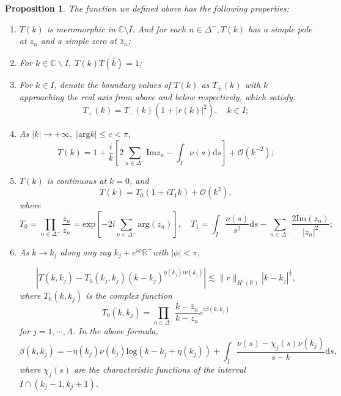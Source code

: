 \documentclass[11pt]{article}
\numberwithin{equation}{section}
\newtheorem{Proposition}{Proposition}
\begin{document}
\begin{Proposition}\label{p8}
    The function we defined above has the following properties:
    \begin{enumerate}[label=\textnormal{(\arabic*)}]
      \item $T(k)$ is meromorphic in $\mathbb{C} \setminus I$. And for each $n \in \Delta^-, T(k)$ has a simple pole at $z_n$ and a simple zero at $\bar{z}_n$;
       \item For $k\in \mathbb{C}\backslash I,\;T(k)\overline{T(\bar{k})}=1$;
       \item For $k \in I$, denote the boundary values of $T(k)$ as $T_{ \pm}(k)$ with $k$ approaching the real axis from above and below respectively, which satisfy:
$$
T_{+}(k)=T_{-}(k)\left(1+|r(k)|^2\right),  \quad k \in I;
$$

\item As $|k|\to+\infty,\;|\mathrm{arg}k|\leqslant c<\pi$,
$$T(k)=1+\frac{i}{k}\left[2\sum_{n\in\Delta^-}\mathrm{Im}z_n-\int_{I}\nu(s)\mathrm{d}s\right]+\mathcal{O}(k^{-2});$$

\item $T(k)$ is continuous at $k=0$, and
\begin{equation}
    T(k)=T_0(1+iT_1k)+\mathcal{O}(k^2),
\end{equation}
where $$T_0=\prod\limits_{n\in\Delta^-}\frac{\bar{z}_n}{z_n}=\mathrm{exp}\left[-2i\sum_{n\in\Delta^-}\mathrm{arg}(z_n)\right],\quad T_1=\int_I\frac{\nu(s)}{s^2}\mathrm{d}s-\sum_{n\in\Delta^-}\frac{2\mathrm{Im}(z_n)}{|z_n|^2};$$


\item As $k \to k_j$ along any ray $k_j+e^{i \phi} \mathbb{R}^{+}$with $|\phi|<\pi$,

\begin{equation}
    \left|T(k, k_j)-T_0(k_j,k_j)\left(k-k_j\right)^{\eta(k_j) i \nu\left(k_j\right)}\right| \lesssim\|r\|_{H^1(\mathbb{R})}\left|k-k_j\right|^{\frac{1}{2}},\label{eq12}
\end{equation}
where $T_0(k,k_j)$ is the complex function
\begin{equation}
  T_0(k,k_j)=\prod_{n \in \Delta^-} \frac{k-\bar{z}_n}{k-z_n} e^{i \beta\left(k,k_j\right)}
\end{equation}
for $j=1, \cdots, \Lambda$. In the above formula,
\begin{equation}
    \beta(k, k_j)=-\eta(k_j)\nu(k_j)\mathrm{log}\left(k-k_j+\eta(k_j)\right)+\int_I\frac{\nu(s)-\chi_j(s)\nu(k_j)}{s-k}\mathrm{d}s,
\end{equation}
where $\chi_j(s)$ are the characteristic functions of the interval $I\cap(k_j-1,k_j+1)$.
    \end{enumerate}
  \end{Proposition}
\end{document}
